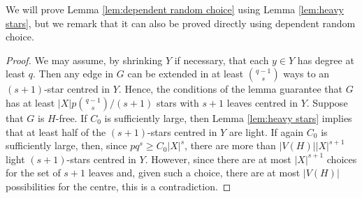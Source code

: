 We will prove Lemma \ref{lem:dependent random choice} using Lemma \ref{lem:heavy stars}, but we remark that it can also be proved directly using dependent random choice.

\begin{proof}
    We may assume, by shrinking $Y$ if necessary, that each $y\in Y$ has degree at least $q$. Then any edge in $G$ can be extended in at least $\binom{q-1}{s}$ ways to an $(s+1)$-star centred in $Y$. Hence, the conditions of the lemma guarantee that $G$ has at least $|X|p\binom{q-1}{s}/(s+1)$ stars with $s+1$ leaves centred in $Y$. Suppose that $G$ is $H$-free. If $C_0$ is sufficiently large, then Lemma \ref{lem:heavy stars} implies that at least half of the $(s+1)$-stars centred in $Y$ are light. If again $C_0$ is sufficiently large, then, since $pq^s\geq C_0|X|^s$, there are more than $|V(H)||X|^{s+1}$ light $(s+1)$-stars centred in $Y$. However, since there are at most $|X|^{s+1}$ choices for the set of $s+1$ leaves and, given such a choice, there are at most $|V(H)|$ possibilities for the centre, this is a contradiction.
\end{proof}

